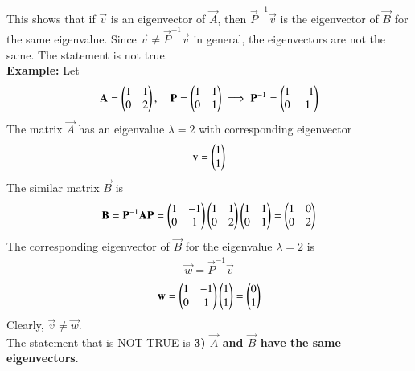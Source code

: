 \documentclass[journal]{IEEEtran}
\begin{document}
This shows that if $\vec{v}$ is an eigenvector of $\vec{A}$, then $\vec{P}^{-1}\vec{v}$ is the eigenvector of $\vec{B}$ for the same eigenvalue. Since $\vec{v} \neq \vec{P}^{-1}\vec{v}$ in general, the eigenvectors are not the same. The statement is not true. \\
\textbf{Example:} Let
\begin{align}
    \mathbf{A} = \begin{pmatrix}1 & 1 \\ 0 & 2\end{pmatrix}, \quad \mathbf{P} = \begin{pmatrix}1 & 1 \\ 0 & 1\end{pmatrix} \implies \mathbf{P}^{-1} = \begin{pmatrix}1 & -1 \\ 0 & 1\end{pmatrix}
\end{align}
The matrix $\vec{A}$ has an eigenvalue $\lambda=2$ with corresponding eigenvector 
\begin{align}
	\mathbf{v} = \begin{pmatrix}1 \\ 1\end{pmatrix}
\end{align}
The similar matrix $\vec{B}$ is
\begin{align}
    \mathbf{B} = \mathbf{P}^{-1}\mathbf{A}\mathbf{P} = \begin{pmatrix}1 & -1 \\ 0 & 1\end{pmatrix}\begin{pmatrix}1 & 1 \\ 0 & 2\end{pmatrix}\begin{pmatrix}1 & 1 \\ 0 & 1\end{pmatrix} = \begin{pmatrix}1 & 0 \\ 0 & 2\end{pmatrix}
\end{align}
The corresponding eigenvector of $\vec{B}$ for the eigenvalue $\lambda=2$ is 
\begin{align}
	\vec{w} = \vec{P}^{-1}\vec{v}
\end{align}
\begin{align}
    \mathbf{w} = \begin{pmatrix}1 & -1 \\ 0 & 1\end{pmatrix}\begin{pmatrix}1 \\ 1\end{pmatrix} = \begin{pmatrix}0 \\ 1\end{pmatrix}
\end{align}
Clearly, $\vec{v} \neq \vec{w}$. \\
The statement that is NOT TRUE is \textbf{3) $\vec{A}$ and $\vec{B}$ have the same eigenvectors}.
\end{document}
